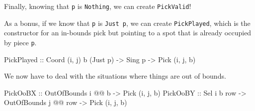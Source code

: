 \documentclass[]{article}
\newenvironment{Shaded}{}{}
\newcommand{\CommentTok}[1]{\textcolor[rgb]{0.38,0.63,0.69}{\textit{#1}}}
\newcommand{\DataTypeTok}[1]{\textcolor[rgb]{0.56,0.13,0.00}{#1}}
\newcommand{\KeywordTok}[1]{\textcolor[rgb]{0.00,0.44,0.13}{\textbf{#1}}}
\newcommand{\NormalTok}[1]{#1}
\newcommand{\OperatorTok}[1]{\textcolor[rgb]{0.40,0.40,0.40}{#1}}
\newcommand{\OtherTok}[1]{\textcolor[rgb]{0.00,0.44,0.13}{#1}}
\begin{document}
\begin{Shaded}
\end{Shaded}

Finally, knowing that \texttt{p} is \texttt{\textquotesingle{}Nothing}, we can
create \texttt{PickValid}!

As a bonus, if we know that \texttt{p} is \texttt{\textquotesingle{}Just\ p}, we
can create \texttt{PickPlayed}, which is the constructor for an in-bounds pick
but pointing to a spot that is already occupied by piece
\texttt{p\textquotesingle{}}.

\begin{Shaded}
\begin{Highlighting}[]
\DataTypeTok{PickPlayed}\OtherTok{ ::} \DataTypeTok{Coord}\NormalTok{ \textquotesingle{}(i, j) b (}\DataTypeTok{\textquotesingle{}Just}\NormalTok{ p)}
           \OtherTok{{-}\textgreater{}} \DataTypeTok{Sing}\NormalTok{ p}
           \OtherTok{{-}\textgreater{}} \DataTypeTok{Pick}\NormalTok{ \textquotesingle{}(i, j, b)}
\end{Highlighting}
\end{Shaded}

We now have to deal with the situations where things are out of bounds.

\begin{Shaded}
\begin{Highlighting}[]
\DataTypeTok{PickOoBX}\OtherTok{ ::} \DataTypeTok{OutOfBounds}\NormalTok{ i }\OperatorTok{@@}\NormalTok{ b}
         \OtherTok{{-}\textgreater{}} \DataTypeTok{Pick}\NormalTok{ \textquotesingle{}(i, j, b)}
\DataTypeTok{PickOoBY}\OtherTok{ ::} \DataTypeTok{Sel}\NormalTok{ i b row}
         \OtherTok{{-}\textgreater{}} \DataTypeTok{OutOfBounds}\NormalTok{ j }\OperatorTok{@@}\NormalTok{ row}
         \OtherTok{{-}\textgreater{}} \DataTypeTok{Pick}\NormalTok{ \textquotesingle{}(i, j, b)}
\end{Highlighting}
\end{Shaded}
\end{document}
